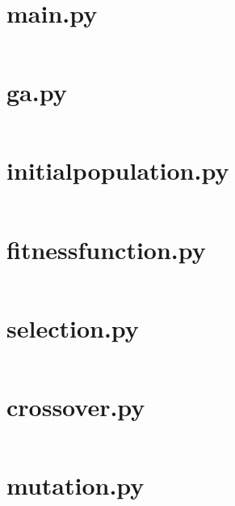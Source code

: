 \documentclass[a4paper, 12pt]{report}
\begin{document}
\section{main.py}
\inputminted[linenos, fontsize=\footnotesize]{Python}{../main.py}

\section{ga.py}
\inputminted[linenos, fontsize=\footnotesize]{Python}{../modules/ga.py}

\section{initial{\textunderscore}population.py}
\inputminted[linenos, fontsize=\footnotesize]{Python}{
	../modules/initial_population.py}

\section{fitness{\textunderscore}function.py}
\inputminted[linenos, fontsize=\footnotesize]{Python}{
	../modules/fitness_function.py}

\section{selection.py}
\inputminted[linenos, fontsize=\footnotesize]{Python}{../modules/selection.py}

\section{crossover.py}
\inputminted[linenos, fontsize=\footnotesize]{Python}{../modules/crossover.py}

\section{mutation.py}
\inputminted[linenos, fontsize=\footnotesize]{Python}{../modules/mutation.py}
\end{document}
